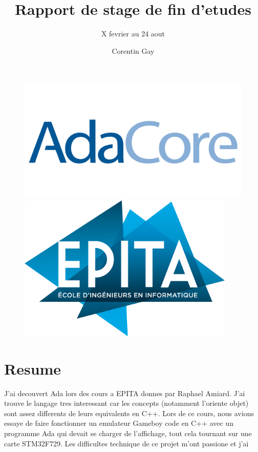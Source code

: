 \documentclass[11pt,]{article}
\title{Rapport de stage de fin d'etudes}
\author{X fevrier au 24 aout}
\date{Corentin Gay}
\begin{document}
\maketitle
\begin{figure}
\centering
	\includegraphics{adacore.jpg}
	\includegraphics[height=7cm]{epita.png}
\end{figure}

\thispagestyle{empty}
\clearpage

{
\setcounter{tocdepth}{3}
\tableofcontents
\thispagestyle{empty}
\clearpage
}
\section{Resume}\label{resume}

J'ai decouvert Ada lors des cours a EPITA donnes par Raphael Amiard.
J'ai trouve le langage tres interessant car les concepts (notamment
l'oriente objet) sont assez differents de leurs equivalents en C++. Lors
de ce cours, nous avions essaye de faire fonctionner un emulateur
Gameboy code en C++ avec un programme Ada qui devait se charger de
l'affichage, tout cela tournant sur une carte STM32F729. Les difficultes
technique de ce projet m'ont passione et j'ai
\end{document}
